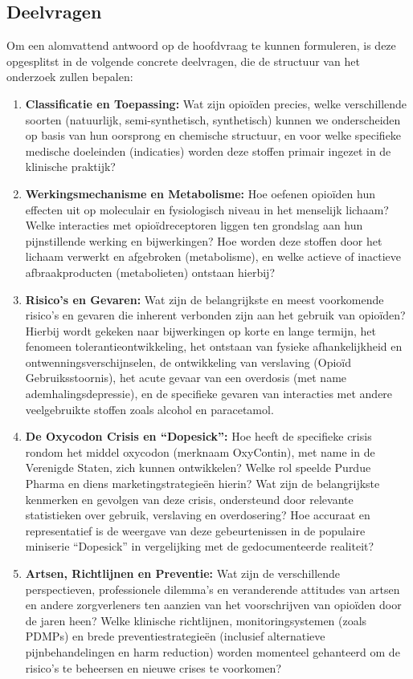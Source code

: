 \documentclass[11pt, a4paper]{report} %
\begin{document}
\subsection{Deelvragen}
Om een alomvattend antwoord op de hoofdvraag te kunnen formuleren, is deze opgesplitst in de volgende concrete deelvragen, die de structuur van het onderzoek zullen bepalen:
\begin{enumerate}
    \item \textbf{Classificatie en Toepassing:} Wat zijn opioïden precies, welke verschillende soorten (natuurlijk, semi-synthetisch, synthetisch) kunnen we onderscheiden op basis van hun oorsprong en chemische structuur, en voor welke specifieke medische doeleinden (indicaties) worden deze stoffen primair ingezet in de klinische praktijk?
    \item \textbf{Werkingsmechanisme en Metabolisme:} Hoe oefenen opioïden hun effecten uit op moleculair en fysiologisch niveau in het menselijk lichaam? Welke interacties met opioïdreceptoren liggen ten grondslag aan hun pijnstillende werking en bijwerkingen? Hoe worden deze stoffen door het lichaam verwerkt en afgebroken (metabolisme), en welke actieve of inactieve afbraakproducten (metabolieten) ontstaan hierbij?
    \item \textbf{Risico's en Gevaren:} Wat zijn de belangrijkste en meest voorkomende risico's en gevaren die inherent verbonden zijn aan het gebruik van opioïden? Hierbij wordt gekeken naar bijwerkingen op korte en lange termijn, het fenomeen tolerantieontwikkeling, het ontstaan van fysieke afhankelijkheid en ontwenningsverschijnselen, de ontwikkeling van verslaving (Opioïd Gebruiksstoornis), het acute gevaar van een overdosis (met name ademhalingsdepressie), en de specifieke gevaren van interacties met andere veelgebruikte stoffen zoals alcohol en paracetamol.
    \item \textbf{De Oxycodon Crisis en \enquote{Dopesick}:} Hoe heeft de specifieke crisis rondom het middel oxycodon (merknaam OxyContin), met name in de Verenigde Staten, zich kunnen ontwikkelen? Welke rol speelde Purdue Pharma en diens marketingstrategieën hierin? Wat zijn de belangrijkste kenmerken en gevolgen van deze crisis, ondersteund door relevante statistieken over gebruik, verslaving en overdosering? Hoe accuraat en representatief is de weergave van deze gebeurtenissen in de populaire miniserie \enquote{Dopesick} in vergelijking met de gedocumenteerde realiteit?
    \item \textbf{Artsen, Richtlijnen en Preventie:} Wat zijn de verschillende perspectieven, professionele dilemma's en veranderende attitudes van artsen en andere zorgverleners ten aanzien van het voorschrijven van opioïden door de jaren heen? Welke klinische richtlijnen, monitoringsystemen (zoals PDMPs) en brede preventiestrategieën (inclusief alternatieve pijnbehandelingen en harm reduction) worden momenteel gehanteerd om de risico's te beheersen en nieuwe crises te voorkomen?

\end{enumerate}
\end{document}
